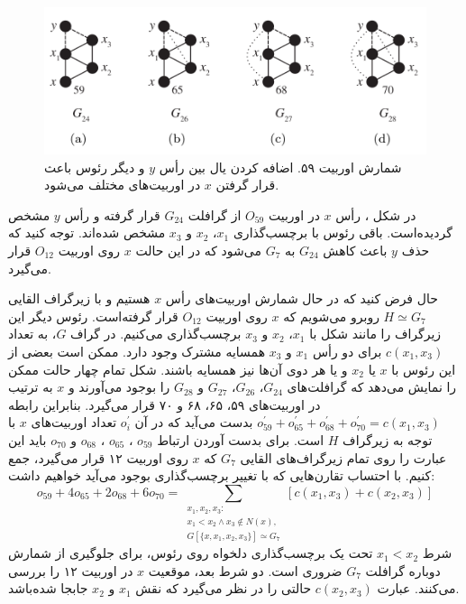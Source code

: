 \begin{figure}[t]
\centering
\includegraphics[scale=0.3]{./o59-orbit-relation.png}
\caption[شمارش اوربیت ۵۹]{شمارش اوربیت ۵۹. اضافه کردن یال بین رأس $y$ و دیگر رئوس باعث قرار گرفتن $x$ در اوربیت‌های مختلف می‌شود.}
\label{fig:o59-orbit-relation}
\end{figure}

در شکل ، رأس $x$ در اوربیت $O_{59}$ از گرافلت $G_{24}$ قرار گرفته و رأس $y$ مشخص گردیده‌است. باقی رئوس با برچسب‌گذاری $x_1$، $x_2$ و $x_3$ مشخص شده‌اند. توجه کنید که حذف $y$ باعث کاهش $G_{24}$ به $G_7$ می‌شود که در این حالت $x$ روی اوربیت $O_{12}$ قرار می‌گیرد.

حال فرض کنید که در حال شمارش اوربیت‌های رأس $x$ هستیم و با زیرگراف القایی $H \simeq G_{7}$ روبرو می‌شویم که $x$ روی اوربیت $O_{12}$ قرار گرفته‌است. رئوس دیگر این زیرگراف را مانند شکل با $x_1$، $x_2$ و $x_3$ برچسب‌گذاری می‌کنیم. در گراف $G$، به تعداد $c(x_1,x_3)$ برای دو رأس $x_1$ و $x_3$ همسایه مشترک وجود دارد. ممکن است بعضی از این رئوس با $x$ یا $x_2$ و یا هر دوی آن‌ها نیز همسایه باشند. شکل  تمام چهار حالت ممکن را نمایش می‌دهد که گرافلت‌های $G_{24}$، $G_{26}$، $G_{27}$ و $G_{28}$ را بوجود می‌آورند و $x$ به ترتیب در اوربیت‌های ۵۹، ۶۵، ۶۸ و ۷۰ قرار می‌گیرد. بنابراین رابطه $o^\prime_{59}+ o^\prime_{65}+o^\prime_{68}+o^\prime_{70} = c(x_1,x_3)$ بدست می‌آید که در آن $o^\prime_i$ تعداد اوربیت‌های $x$ با توجه به زیرگراف $H$ است. برای بدست آوردن ارتباط $o_{59}$ ،  $o_{65}$ ،  $o_{68}$ و  $o_{70}$ باید این عبارت را روی تمام زیرگراف‌های القایی $G_7$ که $x$ روی اوربیت ۱۲ قرار می‌گیرد، جمع کنیم. با احتساب تقارن‌هایی که با تغییر برچسب‌گذاری‌ بوجود می‌آید خواهیم داشت:
\begin{equation*}
o_{59}+4o_{65}+2o_{68}+6o_{70} = \sum_{\substack{x_1,x_2,x_3:\\x_1 < x_2\wedge x_3 \notin N(x),\\G[\{x,x_1,x_2,x_3\}]\simeq G_7}}{[c(x_1,x_3)+c(x_2,x_3)]}
\end{equation*}
شرط $x_1 < x_2$ تحت یک برچسب‌گذاری دلخواه روی رئوس، برای جلوگیری از شمارش دوباره گرافلت $G_7$ ضروری است. دو شرط بعد، موقعیت $x$ در اوربیت ۱۲ را بررسی می‌کنند. عبارت $c(x_2,x_3)$ حالتی را در نظر می‌گیرد که نقش $x_1$ و $x_2$ جابجا شده‌باشد.

